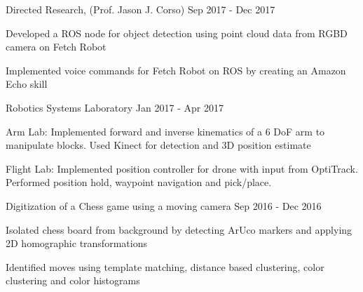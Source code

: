 

\begin{cventries2}

  \cventrymini
    {Directed Research, (Prof. Jason J. Corso)} %
    {Sep 2017 - Dec 2017} %
    {
      \begin{cvitems} 
        \item {Developed a ROS node for object detection using point cloud data from RGBD camera on Fetch Robot}
        \item{Implemented voice commands for Fetch Robot on ROS by creating an Amazon Echo skill}
      \end{cvitems}
    } %
\cventrymini
{Robotics Systems Laboratory} %
{Jan 2017 - Apr 2017} %
{
	\begin{cvitems} 
		\item {Arm Lab: Implemented forward and inverse kinematics of a 6 DoF arm to manipulate blocks. Used Kinect for detection and 3D position estimate}
		\item{Flight Lab: Implemented position controller for drone with input from OptiTrack. Performed position hold, waypoint navigation and pick/place.}
	\end{cvitems}
} %

\vspace{2mm}
	\cventrymini
	{Digitization of a Chess game using a moving camera} %
	{Sep 2016 - Dec 2016} %
	{
		\begin{cvitems} 
			\item {Isolated chess board from background by detecting ArUco markers and applying 2D homographic transformations}
			\item{Identified moves using template matching, distance based clustering, color clustering and color histograms}
		\end{cvitems}
	} %
\end{cventries2}    





